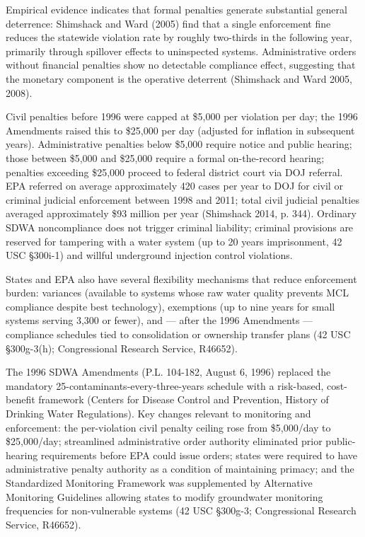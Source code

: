 \documentclass{article}
\begin{document}
Empirical evidence indicates that formal penalties generate substantial general deterrence: Shimshack and Ward (2005) find that a single enforcement fine reduces the statewide violation rate by roughly two-thirds in the following year, primarily through spillover effects to uninspected systems. Administrative orders without financial penalties show no detectable compliance effect, suggesting that the monetary component is the operative deterrent (Shimshack and Ward 2005, 2008).

Civil penalties before 1996 were capped at \$5,000 per violation per day; the 1996 Amendments raised this to \$25,000 per day (adjusted for inflation in subsequent years). Administrative penalties below \$5,000 require notice and public hearing; those between \$5,000 and \$25,000 require a formal on-the-record hearing; penalties exceeding \$25,000 proceed to federal district court via DOJ referral. EPA referred on average approximately 420 cases per year to DOJ for civil or criminal judicial enforcement between 1998 and 2011; total civil judicial penalties averaged approximately \$93 million per year (Shimshack 2014, p. 344). Ordinary SDWA noncompliance does not trigger criminal liability; criminal provisions are reserved for tampering with a water system (up to 20 years imprisonment, 42 USC §300i-1) and willful underground injection control violations.

States and EPA also have several flexibility mechanisms that reduce enforcement burden: variances (available to systems whose raw water quality prevents MCL compliance despite best technology), exemptions (up to nine years for small systems serving 3,300 or fewer), and — after the 1996 Amendments — compliance schedules tied to consolidation or ownership transfer plans (42 USC §300g-3(h); Congressional Research Service, R46652).

The 1996 SDWA Amendments (P.L. 104-182, August 6, 1996) replaced the mandatory 25-contaminants-every-three-years schedule with a risk-based, cost-benefit framework (Centers for Disease Control and Prevention, History of Drinking Water Regulations). Key changes relevant to monitoring and enforcement: the per-violation civil penalty ceiling rose from \$5,000/day to \$25,000/day; streamlined administrative order authority eliminated prior public-hearing requirements before EPA could issue orders; states were required to have administrative penalty authority as a condition of maintaining primacy; and the Standardized Monitoring Framework was supplemented by Alternative Monitoring Guidelines allowing states to modify groundwater monitoring frequencies for non-vulnerable systems (42 USC §300g-3; Congressional Research Service, R46652).
\end{document}
